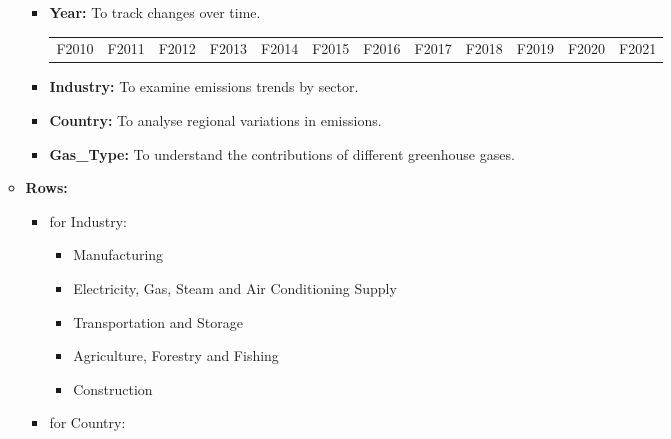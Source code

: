 \documentclass[
]{article}
\begin{document}
\begin{enumerate}
\begin{itemize}
    \begin{itemize}
    \item
      \textbf{Year:} To track changes over time.

      \begin{longtable}[]{@{}
        >{\centering\arraybackslash}p{}
        >{\centering\arraybackslash}p{}
        >{\centering\arraybackslash}p{}
        >{\centering\arraybackslash}p{}
        >{\centering\arraybackslash}p{}
        >{\centering\arraybackslash}p{}
        >{\centering\arraybackslash}p{}
        >{\centering\arraybackslash}p{}
        >{\centering\arraybackslash}p{}
        >{\centering\arraybackslash}p{}
        >{\centering\arraybackslash}p{}
        >{\centering\arraybackslash}p{}@{}}
      \toprule\noalign{}
      \endhead
      \bottomrule\noalign{}
      \endlastfoot
      F2010 & F2011 & F2012 & F2013 & F2014 & F2015 & F2016 & F2017 &
      F2018 & F2019 & F2020 & F2021 \\
      \end{longtable}
    \item
      \textbf{Industry:} To examine emissions trends by sector.
    \item
      \textbf{Country:} To analyse regional variations in emissions.
    \item
      \textbf{Gas\_Type:} To understand the contributions of different
      greenhouse gases.
    \end{itemize}
  \item
    \textbf{Rows:}

    \begin{itemize}
    \item
      for Industry:

      \begin{itemize}
      \item
        Manufacturing
      \item
        Electricity, Gas, Steam and Air Conditioning Supply
      \item
        Transportation and Storage
      \item
        Agriculture, Forestry and Fishing
      \item
        Construction
      \end{itemize}
    \item
      for Country:


\end{itemize}
\end{itemize}
\end{enumerate}
\end{document}
